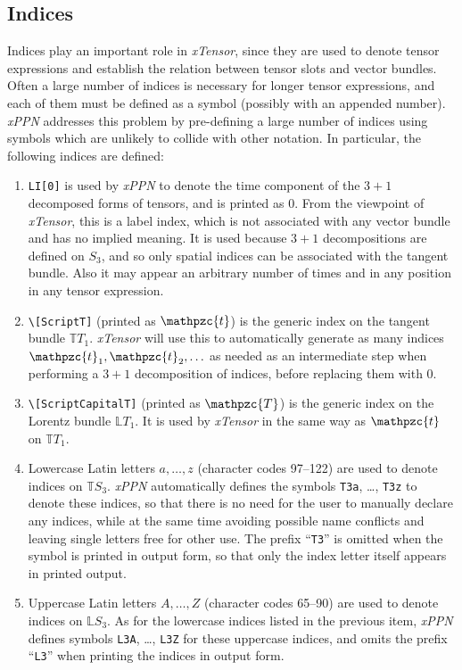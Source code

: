\documentclass[notitlepage,a4paper,aps,prd,onecolumn,superscriptaddress,nofootinbib,groupedaddress,longbibliography]{revtex4-1}
\newcommand{\xPPN}{\emph{xPPN}}
\newcommand{\xTensor}{\emph{xTensor}}
\begin{document}
\subsection{Indices}\label{ssec:indices}
Indices play an important role in \xTensor, since they are used to denote tensor expressions and establish the relation between tensor slots and vector bundles. Often a large number of indices is necessary for longer tensor expressions, and each of them must be defined as a symbol (possibly with an appended number). \xPPN{} addresses this problem by pre-defining a large number of indices using symbols which are unlikely to collide with other notation. In particular, the following indices are defined:
\begin{enumerate}
\item
\lstinline/LI[0]/ is used by \xPPN{} to denote the time component of the $3+1$ decomposed forms of tensors, and is printed as 0. From the viewpoint of \xTensor, this is a label index, which is not associated with any vector bundle and has no implied meaning. It is used because $3+1$ decompositions are defined on \(S_3\), and so only spatial indices can be associated with the tangent bundle. Also it may appear an arbitrary number of times and in any position in any tensor expression.
\item
\lstinline/\[ScriptT]/
(printed as $\mathpzc{t}$) is the generic index on the tangent bundle \(\mathbb{T}T_1\). \xTensor{} will use this to automatically generate as many indices \(\mathpzc{t}_1, \mathpzc{t}_2, \ldots\) as needed as an intermediate step when performing a $3+1$ decomposition of indices, before replacing them with 0.
\item
\lstinline/\[ScriptCapitalT]/
(printed as $\mathpzc{T}$) is the generic index on the Lorentz bundle \(\mathbb{L}T_1\). It is used by \xTensor{} in the same way as \(\mathpzc{t}\) on \(\mathbb{T}T_1\).
\item
Lowercase Latin letters \(a, \ldots, z\) (character codes 97--122) are used to denote indices on \(\mathbb{T}S_3\). \xPPN{} automatically defines the symbols \lstinline/T3a/, \ldots, \lstinline/T3z/ to denote these indices, so that there is no need for the user to manually declare any indices, while at the same time avoiding possible name conflicts and leaving single letters free for other use. The prefix ``\texttt{T3}'' is omitted when the symbol is printed in output form, so that only the index letter itself appears in printed output.
\item
Uppercase Latin letters \(A, \ldots, Z\) (character codes 65--90) are used to denote indices on \(\mathbb{L}S_3\). As for the lowercase indices listed in the previous item, \xPPN{} defines symbols \lstinline/L3A/, \ldots, \lstinline/L3Z/ for these uppercase indices, and omits the prefix ``\texttt{L3}'' when printing the indices in output form.

\end{enumerate}
\end{document}
